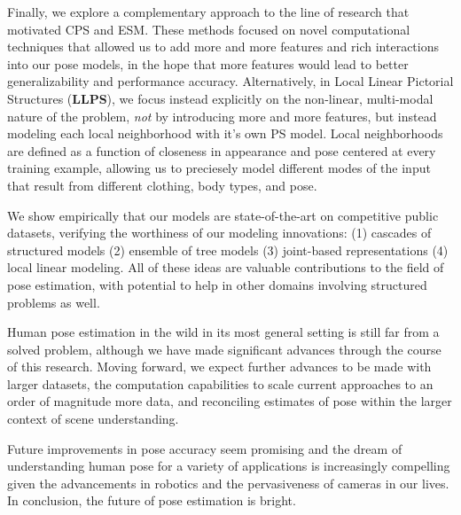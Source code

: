 Finally, we explore a complementary approach to the line of research that 
motivated CPS and ESM.  These methods focused on novel computational techniques 
that allowed us to add more and more features and rich interactions into our 
pose models, in the hope that more features would lead to better 
generalizability and performance accuracy.  Alternatively, in Local Linear 
Pictorial Structures ({\bf LLPS}), we focus instead explicitly on the 
non-linear, multi-modal nature of the problem, {\em not} by introducing more 
and more features, but instead modeling each local neighborhood with it's own 
PS model.  Local neighborhoods are defined as a function of closeness in 
appearance and pose centered at every training example, allowing us to 
preciesely model different modes of the input that result from different 
clothing, body types, and pose.

We show empirically that our models are state-of-the-art on competitive public 
datasets, verifying the worthiness of our modeling innovations: (1) cascades of 
structured models (2) ensemble of tree models (3) joint-based representations 
(4) local linear modeling.  All of these ideas are valuable contributions to 
the field of pose estimation, with potential to help in other domains involving 
structured problems as well.

Human pose estimation in the wild in its most general setting is still far from 
a solved problem, although we have made significant advances through the course 
of this research.  Moving forward, we expect further advances to be made with 
larger datasets, the computation capabilities to scale current approaches to an 
order of magnitude more data, and reconciling estimates of pose within the 
larger context of scene understanding.

Future improvements in pose accuracy seem promising and the dream of 
understanding human pose for a variety of applications is increasingly 
compelling given the advancements in robotics and the pervasiveness of cameras 
in our lives.  In conclusion, the future of pose estimation is bright.

